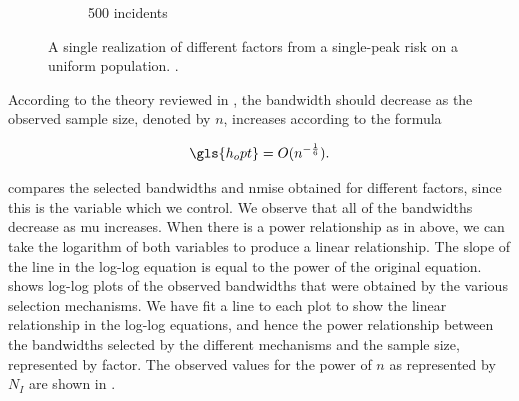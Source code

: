 \begin{figure}[htbp]
\begin{subfigure}{0.45\textwidth}
        \caption{500 incidents}
    \end{subfigure}
        \caption{A single realization of different \glspl{factor} from a single-peak risk on a uniform population.
        \scatterplotcaption.}
        \label{fig:one_sample:unif_NCases_1h}
\end{figure}

According to the theory reviewed in ,
the bandwidth should decrease as the observed sample size,
denoted by $n$,
increases according to the formula

\begin{equation}
    \label{eq:h_opt}
    \gls{h_opt} = O(n^{-\frac{1}{6}}) \text{.}
\end{equation}

 compares the selected bandwidths and \gls{nmise} obtained for different \glspl{factor},
since this is the variable which we control.
We observe that all of the bandwidths decrease as \gls{mu} increases.
When there is a power relationship as in  above, we can take the logarithm of both variables to produce a linear relationship.
The slope of the line in the log-log equation is equal to the power of the original equation.
 shows log-log plots of the observed bandwidths that were obtained by the various selection mechanisms.
We have fit a line to each plot to show the linear relationship in the log-log equations, and hence the power relationship between the bandwidths selected by the different mechanisms and the sample size, represented by \gls{factor}.
The observed values for the power of $n$ as represented by $N_I$ are shown in .





